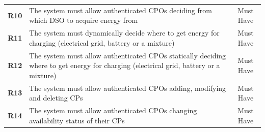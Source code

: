 \begin{table}[H]
\begin{tabularx}{\textwidth}{cXc}
        \textbf{R10} & The system must allow authenticated CPOs deciding from which DSO to acquire energy from                                                                  & Must Have      \\
        \textbf{R11} & The system must dynamically decide where to get energy for charging (electrical grid, battery or a mixture)                                              & Must Have      \\
        \textbf{R12} & The system must allow authenticated CPOs statically deciding where to get energy for charging (electrical grid, battery or a mixture)                    & Must Have      \\
        \textbf{R13} & The system must allow authenticated CPOs adding, modifying and deleting CPs                                                                              & Must Have      \\
        \textbf{R14} & The system must allow authenticated CPOs changing availability status of their CPs                                                                       & Must Have      \\
        \bottomrule
    \end{tabularx}
\end{table}
